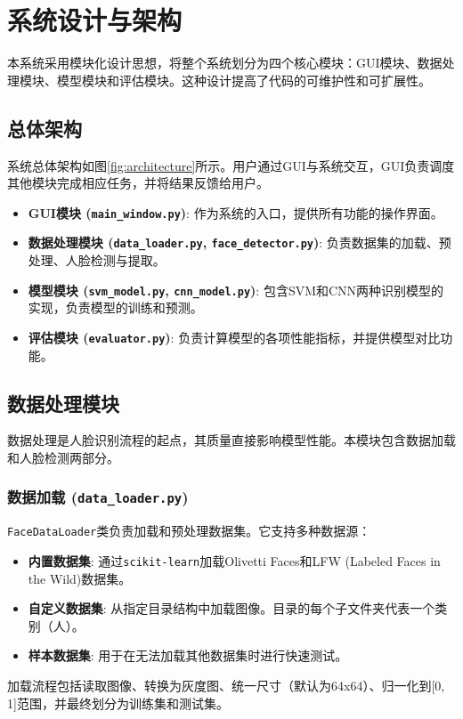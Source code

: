 \documentclass[a4paper]{article}
\begin{document}
\section{系统设计与架构}
本系统采用模块化设计思想，将整个系统划分为四个核心模块：GUI模块、数据处理模块、模型模块和评估模块。这种设计提高了代码的可维护性和可扩展性。

\subsection{总体架构}
系统总体架构如图\ref{fig:architecture}所示。用户通过GUI与系统交互，GUI负责调度其他模块完成相应任务，并将结果反馈给用户。


\begin{itemize}
    \item \textbf{GUI模块 (\texttt{main\_window.py})}: 作为系统的入口，提供所有功能的操作界面。
    \item \textbf{数据处理模块 (\texttt{data\_loader.py}, \texttt{face\_detector.py})}: 负责数据集的加载、预处理、人脸检测与提取。
    \item \textbf{模型模块 (\texttt{svm\_model.py}, \texttt{cnn\_model.py})}: 包含SVM和CNN两种识别模型的实现，负责模型的训练和预测。
    \item \textbf{评估模块 (\texttt{evaluator.py})}: 负责计算模型的各项性能指标，并提供模型对比功能。
\end{itemize}

\subsection{数据处理模块}
数据处理是人脸识别流程的起点，其质量直接影响模型性能。本模块包含数据加载和人脸检测两部分。

\subsubsection{数据加载 (\texttt{data\_loader.py})}
\texttt{FaceDataLoader}类负责加载和预处理数据集。它支持多种数据源：
\begin{itemize}
    \item \textbf{内置数据集}: 通过\texttt{scikit-learn}加载Olivetti Faces和LFW (Labeled Faces in the Wild)数据集。
    \item \textbf{自定义数据集}: 从指定目录结构中加载图像。目录的每个子文件夹代表一个类别（人）。
    \item \textbf{样本数据集}: 用于在无法加载其他数据集时进行快速测试。
\end{itemize}
加载流程包括读取图像、转换为灰度图、统一尺寸（默认为64x64）、归一化到[0, 1]范围，并最终划分为训练集和测试集。
\end{document}
